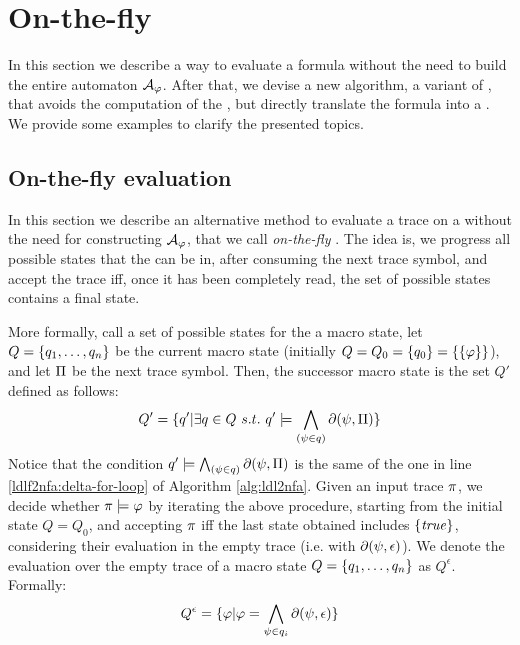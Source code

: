 \section{On-the-fly \DFA}
In this section we describe a way to evaluate a \LLf formula without the need to build the entire automaton $\mathcal{A}_\varphi$. After that, we devise a new algorithm, a variant of \LDLfToNFA, that avoids the computation of the \NFA, but directly translate the formula into a \DFA. We provide some examples to clarify the presented topics.

\subsection{On-the-fly \LLf evaluation}\label{sect:on-the-fly-dfa}
In this section we describe an alternative method to evaluate a trace on a \DFA without the need for constructing $\mathcal{A}_\varphi$, that we call \emph{on-the-fly} \citep{AAAI1817342}. The idea is, we progress all possible states that the \NFA can be in, after consuming the next trace symbol, and accept the trace iff, once it has been completely read, the set of possible states contains a final state.

More formally, call a set of possible
states for the \NFA a macro state, let $Q = \{q_1, \dots, q_n\}$ be the current macro state (initially $Q = Q_0 = \{q_0\} = \{\{\varphi\}\}$), and
let $\Pi$ be the next trace symbol. Then, the successor macro state is the set $Q'$ defined as follows: 
\begin{equation}\label{eq:on-the-fly-progression-rule}
Q' = \{q' | \exists q \in Q\ s.t.\ q' \models \bigwedge_{(\psi \in q)} \partial(\psi, \Pi)\}
\end{equation} Notice that the condition $q' \models \bigwedge_{(\psi \in q)} \partial(\psi, \Pi)$ is the same of the one in line \ref{ldlf2nfa:delta-for-loop} of Algorithm \ref{alg:ldl2nfa}.
Given an input trace $\pi$, we decide whether $\pi \models \varphi$ by iterating
the above procedure, starting from the initial state $Q = Q_0$,
and accepting $\pi$ iff the last state obtained includes $\{\mathit{true}\}$, considering their evaluation in the empty trace (i.e. with $\partial\lparen \psi, \epsilon\rparen$). We denote the evaluation over the empty trace of a macro state $Q = \{q_1, \dots, q_n\}$ as $Q^\epsilon$. Formally:
\begin{equation}\label{eq:macro-state-epsilon}
Q^\epsilon = \{\varphi | \varphi = \bigwedge_{\psi\in q_i} \partial\lparen \psi, \epsilon\rparen\}
\end{equation}

